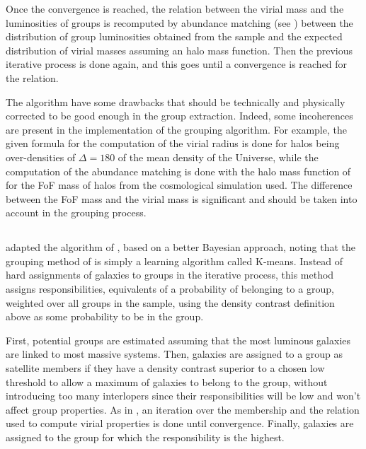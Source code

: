 Once the convergence is reached, the relation between the virial mass and the
luminosities of groups is recomputed by abundance matching (see
) between the distribution of group luminosities
obtained from the sample and the expected distribution of virial masses
assuming an halo mass function. Then the previous iterative process is done
again, and this goes until a convergence is reached for the relation.

The algorithm have some drawbacks that should be technically and physically
corrected to be good enough in the group extraction. Indeed, some incoherences
are present in the implementation of the grouping algorithm. For example, the
given formula for the computation of the virial radius is done for halos being
over-densities of $\Delta=180$ of the mean density of the Universe, while the
computation of the abundance matching is done with the halo mass function of
\citet{Warren+06} for the FoF mass of halos from the cosmological simulation
used. The difference between the FoF mass and the virial mass is significant
and should be taken into account in the grouping process.

\subsection{\citet{DominguezRomero+12}}
\label{sub:dominguezromero12}

\cite{DominguezRomero+12} adapted the algorithm of \citet{Yang+07}, based on a
better Bayesian approach, noting that the grouping method of \citet{Yang+07} is
simply a learning algorithm called K-means. Instead of hard assignments of
galaxies to groups in the iterative process, this method assigns
responsibilities, equivalents of a probability of belonging to a group,
weighted over all groups in the sample, using the density contrast definition
above as some probability to be in the group.

First, potential groups are estimated assuming that the most luminous galaxies
are linked to most massive systems. Then, galaxies are assigned to a group as
satellite members if they have a density contrast superior to a chosen low
threshold to allow a maximum of galaxies to belong to the group, without
introducing too many interlopers since their responsibilities will be low and
won't affect group properties. As in \citet{Yang+07}, an iteration over the
membership and the relation used to compute virial properties is done until
convergence. Finally, galaxies are assigned to the group for which the
responsibility is the highest.

